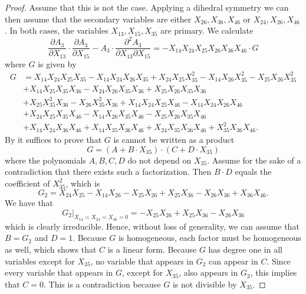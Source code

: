 \documentclass[a4paper,10pt]{amsart}
\theoremstyle{definition}
\theoremstyle{plain}
\begin{document}
\begin{proof}
    Assume that this is not the case. Applying a dihedral symmetry we can then assume that the secondary variables are either $X_{26},X_{36},X_{46}$ or $X_{24},X_{26},X_{46}$. In both cases, the variables $X_{13},X_{15},X_{35}$ are primary. We calculate
    \begin{equation*}
        \frac{\partial A_3}{\partial X_{13}}\cdot \frac{\partial A_3}{\partial X_{15}}- A_3\cdot \frac{\partial^2 A_3}{\partial X_{13}\partial X_{15}}=-X_{14} X_{24} X_{25} X_{26} X_{36} X_{46}\cdot G
    \end{equation*}
    where $G$ is given by
    \begin{align*}
        G&=X_{14} X_{24} X_{25} X_{35} - X_{14} X_{24} X_{26} X_{35} + X_{24} X_{25} X_{35}^2 - X_{14} X_{26} X_{35}^2 -  X_{25} X_{26} X_{35}^2\\& + X_{14} X_{25} X_{35} X_{36} - X_{24} X_{26} X_{35} X_{36} + X_{25} X_{26} X_{35} X_{36}\\& +  X_{25} X_{35}^2 X_{36} - X_{26} X_{35}^2 X_{36} + X_{14} X_{24} X_{25} X_{46} - X_{14} X_{24} X_{26} X_{46}\\& +  X_{24} X_{25} X_{35} X_{46} - X_{14} X_{26} X_{35} X_{46} - X_{25} X_{26} X_{35} X_{46}\\& +  X_{14} X_{24} X_{36} X_{46} + X_{14} X_{35} X_{36} X_{46} + X_{24} X_{35} X_{36} X_{46} + X_{35}^2 X_{36} X_{46}.
    \end{align*}
    By  it suffices to prove that $G$ is cannot be written as a product 
    \begin{equation*}
        G=(A+B\cdot X_{35})\cdot(C+D\cdot X_{35})
    \end{equation*}
    where the polynomials $A,B,C,D$ do not depend on $X_{35}$. 
    Assume for the sake of a contradiction that there exists such a factorization.
    Then $B\cdot D$ equals the coefficient of $X_{35}^2$, which is
    \begin{equation*}
        G_2=X_{24} X_{25} - X_{14} X_{26} - X_{25} X_{26} + X_{25} X_{36} - X_{26} X_{36} + X_{36} X_{46}.
    \end{equation*}
    We have that
    \begin{equation*}
        G_2|_{X_{14}=X_{24}=X_{46}=0}= - X_{25} X_{26} + X_{25} X_{36} - X_{26} X_{36}
    \end{equation*}
    which is clearly irreducible. Hence, without loss of generality, we can assume that $B=G_2$ and $D=1$. Because $G$ is homogeneous, each factor must be homogeneous as well, which shows that $C$ is a linear form. Because $G$ has degree one in all variables except for $X_{35}$, no variable that appears in $G_2$ can appear in $C$. Since every variable that appears in $G$, except for $X_{35}$, also appears in $G_2$, this implies that $C=0$. This is a contradiction because $G$ is not divisible by $X_{35}$.
\end{proof}
\end{document}
